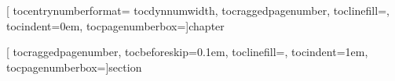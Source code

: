 
\newcommand\tocpageseparator{\hspace{2ex}}
\newcommand\tocpagenumberbox[1]{\mbox{#1}}%

\newcommand\tocchapternumber[1]{}

\RedeclareSectionCommands[
   tocentrynumberformat=\tocchapternumber, 
  tocdynnumwidth,
  tocraggedpagenumber,
  toclinefill=\tocpageseparator,
  tocindent=0em,
  tocpagenumberbox=\tocpagenumberbox
]{chapter}

\RedeclareSectionCommands[
  tocraggedpagenumber,
 tocbeforeskip=0.1em,
  toclinefill=\tocpageseparator,
  tocindent=1em,
  tocpagenumberbox=\tocpagenumberbox%
]{section}

\setcounter{tocdepth}{1}

\makeatletter
\g@addto@macro\@marginparreset{\footnotesize\RaggedRight}
\makeatother